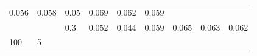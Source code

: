 \documentclass[12pt,oneside,a4paper]{reedthesis}
\begin{document}
\begin{longtable}[]{@{}lllllllll@{}}
\begin{minipage}[t]{0.08\columnwidth}
0.056\strut
\end{minipage} & \begin{minipage}[t]{0.08\columnwidth}\raggedright
0.058\strut
\end{minipage} & \begin{minipage}[t]{0.08\columnwidth}\raggedright
0.05\strut
\end{minipage} & \begin{minipage}[t]{0.08\columnwidth}\raggedright
0.069\strut
\end{minipage} & \begin{minipage}[t]{0.08\columnwidth}\raggedright
0.062\strut
\end{minipage} & \begin{minipage}[t]{0.08\columnwidth}\raggedright
0.059\strut
\end{minipage}\tabularnewline
\begin{minipage}[t]{0.12\columnwidth}\raggedright
\strut
\end{minipage} & \begin{minipage}[t]{0.09\columnwidth}\raggedright
\strut
\end{minipage} & \begin{minipage}[t]{0.06\columnwidth}\raggedright
0.3\strut
\end{minipage} & \begin{minipage}[t]{0.08\columnwidth}\raggedright
0.052\strut
\end{minipage} & \begin{minipage}[t]{0.08\columnwidth}\raggedright
0.044\strut
\end{minipage} & \begin{minipage}[t]{0.08\columnwidth}\raggedright
0.059\strut
\end{minipage} & \begin{minipage}[t]{0.08\columnwidth}\raggedright
0.065\strut
\end{minipage} & \begin{minipage}[t]{0.08\columnwidth}\raggedright
0.063\strut
\end{minipage} & \begin{minipage}[t]{0.08\columnwidth}\raggedright
0.062\strut
\end{minipage}\tabularnewline
\begin{minipage}[t]{0.12\columnwidth}\raggedright
100\strut
\end{minipage} & \begin{minipage}[t]{0.09\columnwidth}\raggedright
5\strut
\end{minipage} & \begin{minipage}[t]{0.06\columnwidth}\raggedright

\end{minipage}
\end{longtable}
\end{document}
